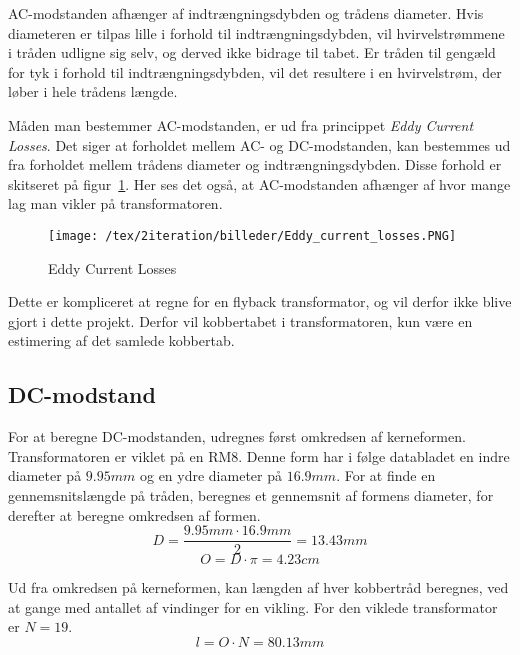 AC-modstanden afhænger af indtrængningsdybden og trådens diameter. Hvis diameteren er tilpas lille i forhold til indtrængningsdybden, vil  hvirvelstrømmene i tråden udligne sig selv, og derved ikke bidrage til tabet. Er tråden til gengæld for tyk i forhold til indtrængningsdybden, vil det resultere i en hvirvelstrøm, der løber i hele trådens længde. 

Måden man bestemmer AC-modstanden, er ud fra princippet \textit{Eddy Current Losses}. Det siger at forholdet mellem AC- og DC-modstanden, kan bestemmes ud fra forholdet mellem trådens diameter og indtrængningsdybden. Disse forhold er skitseret på figur~\ref{fig:Eddy_current_losses}\cite{eddy_current_losses}. Her ses det også, at AC-modstanden afhænger af hvor mange lag man vikler på transformatoren. 

\begin{figure}[H]
	\center
	\texttt{[image: /tex/2iteration/billeder/Eddy\_current\_losses.PNG]}
	\caption{Eddy Current Losses}
	\label{fig:Eddy_current_losses}
\end{figure}

Dette er kompliceret at regne for en flyback transformator, og vil derfor ikke blive gjort i dette projekt. Derfor vil kobbertabet i transformatoren, kun være en estimering af det samlede kobbertab.

\subsection{DC-modstand}
For at beregne DC-modstanden, udregnes først omkredsen af kerneformen. Transformatoren er viklet på en RM8. Denne form har i følge databladet en indre diameter på $9.95mm$ og en ydre diameter på $16.9mm$. For at finde en gennemsnitslængde på tråden, beregnes et gennemsnit af formens diameter, for derefter at beregne omkredsen af formen.
\begin{equation} \label{Diameter}
D = \frac{9.95mm \cdot 16.9mm}{2} = 13.43mm
\end{equation}
\begin{equation} \label{Omkreds}
O = D \cdot \pi = 4.23cm
\end{equation}

Ud fra omkredsen på kerneformen, kan længden af hver kobbertråd beregnes, ved at gange med antallet af vindinger for en vikling. For den viklede transformator er $N=19$.
\begin{equation} \label{Lengde}
l = O \cdot N = 80.13mm
\end{equation}

